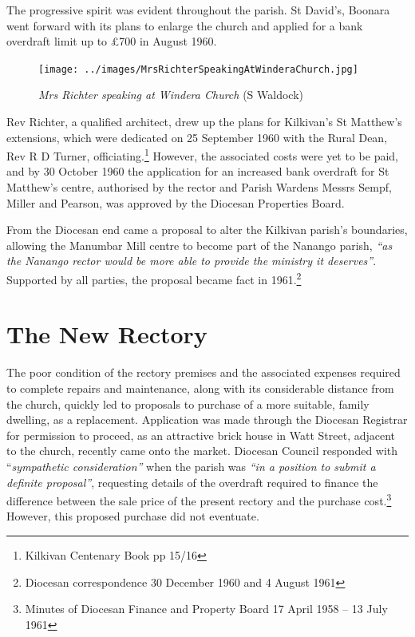 The progressive spirit was evident throughout the parish. St David's, Boonara went forward with its plans to enlarge the church and applied for a bank overdraft limit up to \pounds700 in August 1960.









\begin{figure}[!htb]
\begin{center}
\texttt{[image: ../images/MrsRichterSpeakingAtWinderaChurch.jpg]}
\caption{{\itshape Mrs Richter speaking at Windera Church} {\scriptsize(S Waldock)}}
\end{center}
\end{figure}




Rev Richter, a qualified architect, drew up the plans for Kilkivan's St Matthew's extensions, which were dedicated on 25 September 1960 with the Rural Dean, Rev R D Turner, officiating.\footnote{Kilkivan Centenary Book pp 15/16} However, the associated costs were yet to be paid, and by 30 October 1960 the application for an increased bank overdraft for St Matthew's centre, authorised by the rector and Parish Wardens Messrs Sempf, Miller and Pearson, was approved by the Diocesan Properties Board.


From the Diocesan end came a proposal to alter the Kilkivan parish's boundaries, allowing the Manumbar Mill centre to become part of the Nanango parish, \emph{``as the Nanango rector would be more able to provide the ministry it deserves''}. Supported by all parties, the proposal became fact in 1961.\footnote{Diocesan correspondence 30 December 1960 and 4 August 1961}


\section{The New Rectory}



The poor condition of the rectory premises and the associated expenses required to complete repairs and maintenance, along with its considerable distance from the church, quickly led to proposals to purchase of a more suitable, family dwelling, as a replacement. Application was made through the Diocesan Registrar for permission to proceed, as an attractive brick house in Watt Street, adjacent to the church, recently came onto the market. Diocesan Council responded with ``\emph{sympathetic consideration''} when the parish was \emph{``in a position to submit a definite proposal''}, requesting details of the overdraft required to finance the difference between the sale price of the present rectory and the purchase cost.\footnote{Minutes of Diocesan Finance and Property Board 17 April 1958 -- 13 July 1961} However, this proposed purchase did not eventuate.








